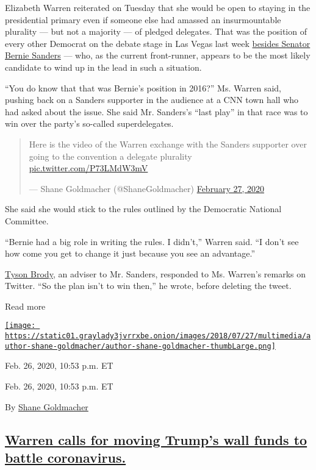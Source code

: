 Elizabeth Warren reiterated on Tuesday that she would be open to staying
in the presidential primary even if someone else had amassed an
insurmountable plurality --- but not a majority --- of pledged
delegates. That was the position of every other Democrat on the debate
stage in Las Vegas last week
\href{https://www.nytimes3xbfgragh.onion/2020/02/22/us/politics/democratic-primary-dnc-superdelegates.html}{besides
Senator Bernie Sanders} --- who, as the current front-runner, appears to
be the most likely candidate to wind up in the lead in such a situation.

``You do know that that was Bernie's position in 2016?'' Ms. Warren
said, pushing back on a Sanders supporter in the audience at a CNN town
hall who had asked about the issue. She said Mr. Sanders's ``last play''
in that race was to win over the party's so-called superdelegates.

\begin{quote}
Here is the video of the Warren exchange with the Sanders supporter over
going to the convention a delegate plurality
\href{https://t.co/P73LMdW3mV}{pic.twitter.com/P73LMdW3mV}

--- Shane Goldmacher (@ShaneGoldmacher)
\href{https://twitter.com/ShaneGoldmacher/status/1232885322586951680?ref_src=twsrc\%5Etfw}{February
27, 2020}
\end{quote}

She said she would stick to the rules outlined by the Democratic
National Committee.

``Bernie had a big role in writing the rules. I didn't,'' Warren said.
``I don't see how come you get to change it just because you see an
advantage.''

\href{https://twitter.com/tysonbrody}{Tyson Brody}, an adviser to Mr.
Sanders, responded to Ms. Warren's remarks on Twitter. ``So the plan
isn't to win then,'' he wrote, before deleting the tweet.

Read more

\href{https://www.nytimes3xbfgragh.onion/by/shane-goldmacher}{\texttt{[image: https://static01.graylady3jvrrxbe.onion/images/2018/07/27/multimedia/author-shane-goldmacher/author-shane-goldmacher-thumbLarge.png]}}

Feb. 26, 2020, 10:53 p.m. ET

Feb. 26, 2020, 10:53 p.m. ET

By \href{https://www.nytimes3xbfgragh.onion/by/shane-goldmacher}{Shane
Goldmacher}

\hypertarget{warren-calls-for-moving-trumps-wall-funds-to-battle-coronavirus}{%
\subsection{\texorpdfstring{\protect\hyperlink{elizabeth-warren-cnn}{Warren
calls for moving Trump's wall funds to battle
coronavirus.}}{Warren calls for moving Trump's wall funds to battle coronavirus.}}\label{warren-calls-for-moving-trumps-wall-funds-to-battle-coronavirus}}

